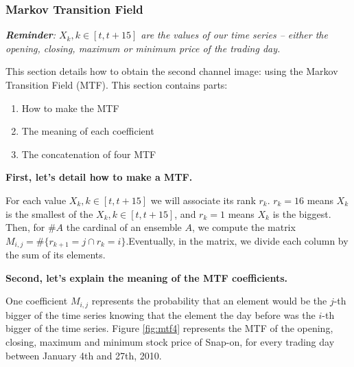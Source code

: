 \documentclass[11pt]{article}
\begin{document}
\begin{onehalfspace}
\subsubsection{Markov Transition Field}
\label{sec:mtf}

\textit{\textbf{Reminder}: $X_k, k \in [t, t+15]$ are the values of our time series -- either the opening, closing, maximum or minimum price of the trading day.}

This section details how to obtain the second channel image: using the Markov Transition Field (MTF). This section contains parts:

\begin{enumerate}
    \item How to make the MTF
    \item The meaning of each coefficient
    \item The concatenation of four MTF
\end{enumerate}

\noindent \textbf{First, let's detail how to make a MTF.}

For each value $X_k, k \in [t, t+15]$ we will associate its rank $r_k$. $r_k = 16$ means $X_k$ is the smallest of the $X_k, k \in [t, t+15]$, and $r_k = 1$ means $X_k$ is the biggest. Then, for $\#A$ the cardinal of an ensemble $A$, we compute the matrix $M_{i,j} = \# \{r_{k+1} = j \cap r_k = i \}$.Eventually, in the matrix, we divide each column by the sum of its elements.

\noindent \textbf{Second, let's explain the meaning of the MTF coefficients.}

One coefficient $M_{i,j}$ represents the probability that an element would be the $j$-th bigger of the time series knowing that the element the day before was the $i$-th bigger of the time series. Figure \ref{fig:mtf4} represents the MTF of the opening, closing, maximum and minimum stock price of Snap-on, for every trading day between January 4th and 27th, 2010.


\end{onehalfspace}
\end{document}
